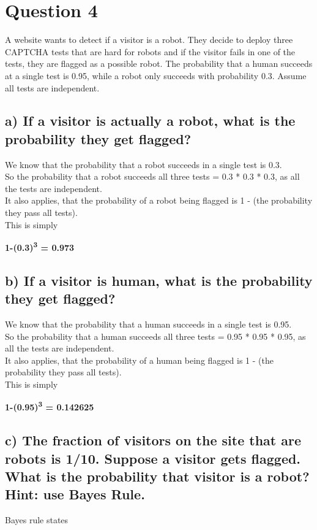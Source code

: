 \documentclass{report}
\begin{document}
		
			\section*{\hfil Question 4 \hfil}
			A website wants to detect if a visitor is a robot. They decide to deploy three CAPTCHA tests that are hard for robots and if the visitor fails in one of the tests, 
			they are flagged as a possible robot. The probability that a human succeeds at a single test is 0.95, while a robot only succeeds with probability 0.3. 
			Assume all tests are independent.
				\subsection*{a) If a visitor is actually a robot, what is the probability they get flagged?}
					We know that the probability that a robot succeeds in a single test is 0.3.\\
					So the probability that a robot succeeds all three tests = 0.3 * 0.3 * 0.3, as all the tests are independent.\\
					It also applies, that the probability of a robot being flagged is 1 - (the probability they pass all tests).\\
					This is simply
				
					\begin{center}
						\textbf{1-(0.3)\textsuperscript{3} = 0.973}
					\end{center}
		
				\subsection*{b) If a visitor is human, what is the probability they get flagged?}
					We know that the probability that a human succeeds in a single test is 0.95.\\
					So the probability that a human succeeds all three tests = 0.95 * 0.95 * 0.95, as all the tests are independent.\\
					It also applies, that the probability of a human being flagged is 1 - (the probability they pass all tests).\\
					This is simply
				
					\begin{center}
						\textbf{1-(0.95)\textsuperscript{3} = 0.142625}
					\end{center}
		
				\subsection*{c) The fraction of visitors on the site that are robots is 1/10. Suppose a visitor gets flagged. What is the probability that visitor is a robot? Hint: use Bayes Rule.}
					Bayes rule states 
		
\end{document}
